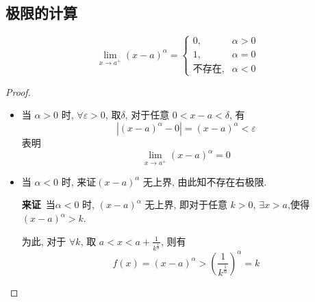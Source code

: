 
\subsection{极限的计算}
\begin{example}
    \begin{equation}
      \lim_{x \to a^{+}} \left( x - a \right) ^{\alpha} = 
      \begin{cases} 
        0, & \alpha > 0 
        \\ 
        1, & \alpha = 0
        \\
        \text{不存在}, & \alpha < 0 
      \end{cases}
    \end{equation}
\end{example}
\begin{proof}
    \begin{itemize}
        \item 当 $\alpha > 0$ 时, $\forall \varepsilon > 0$, 取$\delta $, 对于任意 $0 < x - a < \delta $, 有
        \begin{equation}
            \left| \left( x - a \right) ^{\alpha} - 0 \right| = \left( x - a \right) ^{\alpha} < \varepsilon
        \end{equation}
        表明
        \begin{equation}
            \lim_{x \to a^{+}} \left( x - a \right) ^{\alpha} = 0
        \end{equation}

        \item 当 $\alpha < 0 $ 时, 来证$\left( x - a \right)^{\alpha} $ 无上界, 由此知不存在右极限.
        
        \textbf{来证}\ 当$\alpha < 0$ 时, $\left( x - a \right)^{\alpha} $ 无上界, 即对于任意 $k > 0$, $\exists x > a $,使得 $\left( x - a \right)^{\alpha} > k$.

        为此, 对于 $\forall k$, 取 $a < x < a + \frac{1}{k^{\frac{1}{\alpha}}}$, 则有
        \begin{equation}
            f \left( x \right) = \left( x - a \right)^{\alpha} > \left( \frac{1}{k^{\frac{1}{\alpha}}} \right)^{\alpha} = k
        \end{equation}
    \end{itemize}
\end{proof}

